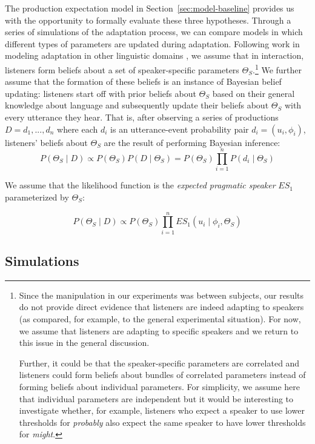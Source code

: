 \documentclass[man, floatsintext]{apa6}
\newcommand{\sectionref}[1]{Section~\ref{#1}}
\begin{document}
The production expectation model in \sectionref{sec:model-baseline} provides us with the opportunity to formally evaluate these three hypotheses.
Through a series of simulations of the adaptation process, we can compare models in which different types of parameters are
 updated during adaptation. Following work in modeling adaptation in other linguistic domains \parencite[e.g.,][]{Kleinschmidt2012,Kleinschmidt2015,Qing2014,Hawkins2017,Roettger2019}, 
we assume that in interaction, listeners form beliefs about a set of speaker-specific parameters $\Theta_S$.\footnote{Since the manipulation in our experiments was between subjects, our results do not provide direct evidence that listeners are indeed adapting to speakers (as compared, for example, to the general experimental situation). For now, we assume that listeners are adapting to specific speakers and we return to this issue in the general discussion.

Further, it could be that the speaker-specific parameters are correlated and  listeners could form beliefs about bundles of correlated parameters instead of forming beliefs about individual parameters. For simplicity, we assume here that individual parameters are independent but it would be interesting to investigate whether, for example, listeners who expect a speaker to use lower thresholds for \textit{probably} also expect the same speaker to have lower thresholds for \textit{might}.}
We further assume that the formation of these beliefs is an instance of Bayesian belief updating:
listeners start off with prior beliefs about $\Theta_S$ based on their general knowledge about 
language and subsequently update their beliefs about $\Theta_S$ with every utterance they hear. 
That is, after observing a series of productions $D={d_1, ..., d_n}$ where each $d_i$ is an 
utterance-event probability pair $d_i = (u_i, \phi_i)$, listeners' beliefs about $\Theta_S$ are the result
of performing Bayesian inference:
$$P(\Theta_S \mid D) \propto P(\Theta_S) P(D \mid \Theta_S) = P(\Theta_S) \prod_{i=1}^nP(d_i \mid \Theta_S) $$

\noindent We assume that the likelihood function is the \textit{expected pragmatic speaker} $ES_1$ parameterized by $\Theta_S$:

$$P(\Theta_S \mid D) \propto P(\Theta_S)  \prod_{i=1}^n ES_1(u_i \mid \phi_i, \Theta_S) $$



\subsection{Simulations}
\end{document}
